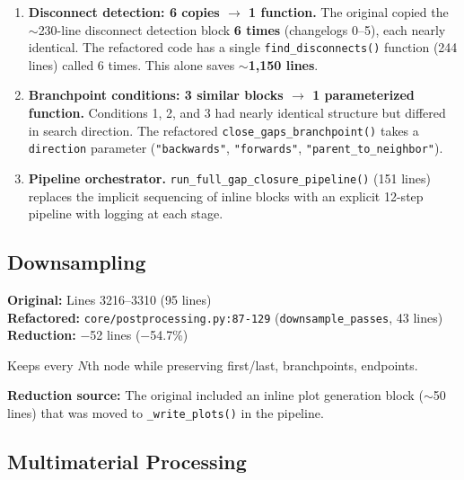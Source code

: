 \documentclass[11pt,letterpaper]{article}
\newcommand{\code}[1]{\texttt{#1}}
\begin{document}
\begin{enumerate}
    \item \textbf{Disconnect detection: 6 copies $\to$ 1 function.} The original copied the $\sim$230-line disconnect detection block \textbf{6 times} (changelogs 0--5), each nearly identical. The refactored code has a single \code{find\_disconnects()} function (244 lines) called 6 times. This alone saves $\sim$\textbf{1,150 lines}.

    \item \textbf{Branchpoint conditions: 3 similar blocks $\to$ 1 parameterized function.} Conditions 1, 2, and 3 had nearly identical structure but differed in search direction. The refactored \code{close\_gaps\_branchpoint()} takes a \code{direction} parameter (\code{"backwards"}, \code{"forwards"}, \code{"parent\_to\_neighbor"}).

    \item \textbf{Pipeline orchestrator.} \code{run\_full\_gap\_closure\_pipeline()} (151 lines) replaces the implicit sequencing of inline blocks with an explicit 12-step pipeline with logging at each stage.
\end{enumerate}

\subsection{Downsampling}

\textbf{Original:} Lines 3216--3310 (95 lines)\\
\textbf{Refactored:} \code{core/postprocessing.py:87-129} (\code{downsample\_passes}, 43 lines)\\
\textbf{Reduction:} $-$52 lines ($-$54.7\%)

Keeps every $N$th node while preserving first/last, branchpoints, endpoints.

\textbf{Reduction source:} The original included an inline plot generation block ($\sim$50 lines) that was moved to \code{\_write\_plots()} in the pipeline.

\subsection{Multimaterial Processing}
\end{document}
